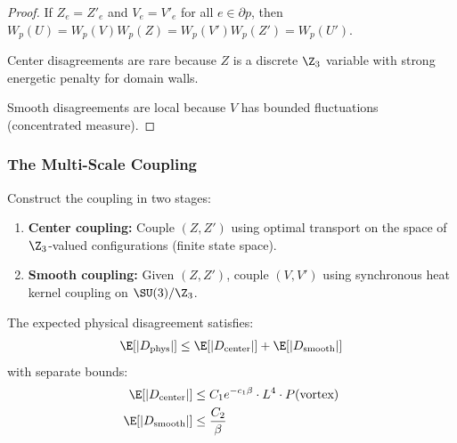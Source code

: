\begin{proof}
If $Z_e = Z'_e$ and $V_e = V'_e$ for all $e \in \partial p$, then 
$W_p(U) = W_p(V) W_p(Z) = W_p(V') W_p(Z') = W_p(U')$.

Center disagreements are rare because $Z$ is a discrete $\Z_3$ variable with 
strong energetic penalty for domain walls.

Smooth disagreements are local because $V$ has bounded fluctuations (concentrated measure).
\end{proof}

\subsubsection{The Multi-Scale Coupling}

\begin{definition}
Construct the coupling in two stages:
\begin{enumerate}
\item \textbf{Center coupling:} Couple $(Z, Z')$ using optimal transport on the 
space of $\Z_3$-valued configurations (finite state space).
\item \textbf{Smooth coupling:} Given $(Z, Z')$, couple $(V, V')$ using synchronous 
heat kernel coupling on $\SU(3)/\Z_3$.
\end{enumerate}
\end{definition}

\begin{theorem}\label{thm:multiscale}
The expected physical disagreement satisfies:
\[
\E[|D_{\mathrm{phys}}|] \leq \E[|D_{\mathrm{center}}|] + \E[|D_{\mathrm{smooth}}|]
\]
with separate bounds:
\begin{align}
\E[|D_{\mathrm{center}}|] &\leq C_1 e^{-c_1 \beta} \cdot L^4 \cdot P(\text{vortex}) \\
\E[|D_{\mathrm{smooth}}|] &\leq \frac{C_2}{\beta}
\end{align}
\end{theorem}

